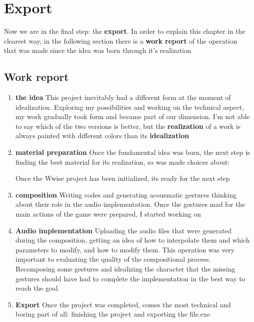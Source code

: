 
\chapter{Export}
\label{chp:fundamentals}

Now we are in the final step: the \textbf{export}.
In order to explain this chapter in the clearest way, in the following section there is a \textbf{work report} of the operation that was made since the idea was born through it's realization

\section{Work report}

	\begin{enumerate}
		\item \textbf{the idea} This project inevitably had a different form at the moment of idealization. Exploring my possibilities and working on the technical aspect, my work gradually took form and became part of our dimension. I'm not able to say which of the two versions is better, but the \textbf{realization} of a work is always painted with different colors than its \textbf{idealization}
		
		\item \textbf{material preparation} Once the fundamental idea was born, the next step is finding the best material for its realization, so was made choices about:
			
		Once the Wwise project has been initialized, its ready for the next step
		
		\item \textbf{composition} Writing codes and generating acousmatic gestures thinking about their role in the audio implementation.
		Once the gestures mad for the main actions of the game were prepared, I started working on 
		
		\item \textbf{Audio implementation} Uploading the audio files that were generated during the composition, getting an idea of ​​how to interpolate them and which parameters to modify, and how to modify them.
		This operation was very important to evaluating the quality of the compositional process. Recomposing some gestures and idealizing the character that the missing gestures should have had to complete the implementation in the best way to reach the goal.
		
		\item \textbf{Export} Once the project was completed, comes the most technical and boring part of all: finishing the project and exporting the file.exe
	\end{enumerate}

